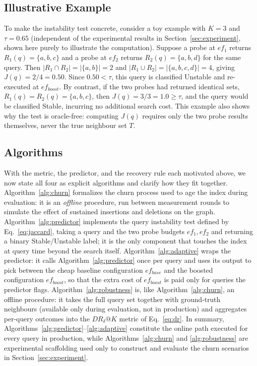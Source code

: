 \documentclass{ieeeaccess}
\begin{document}
\subsection{Illustrative Example}
\label{sec:toyexample}
To make the instability test concrete, consider a toy example with $K=3$ and $\tau=0.65$ (independent of the experimental results in Section~\ref{sec:experiment}, shown here purely to illustrate the computation). Suppose a probe at $ef_1$ returns $R_1(q)=\{a,b,c\}$ and a probe at $ef_2$ returns $R_2(q)=\{a,b,d\}$ for the same query. Then $|R_1\cap R_2|=|\{a,b\}|=2$ and $|R_1\cup R_2|=|\{a,b,c,d\}|=4$, giving $J(q)=2/4=0.50$. Since $0.50<\tau$, this query is classified Unstable and re-executed at $ef_{boost}$. By contrast, if the two probes had returned identical sets, $R_1(q)=R_2(q)=\{a,b,c\}$, then $J(q)=3/3=1.0 \ge \tau$, and the query would be classified Stable, incurring no additional search cost. This example also shows why the test is oracle-free: computing $J(q)$ requires only the two probe results themselves, never the true neighbour set $T$.

\subsection{Algorithms}
With the metric, the predictor, and the recovery rule each motivated above, we now state all four as explicit algorithms and clarify how they fit together. Algorithm~\ref{alg:churn} formalizes the churn process used to age the index during evaluation: it is an \emph{offline} procedure, run between measurement rounds to simulate the effect of sustained insertions and deletions on the graph. Algorithm~\ref{alg:predictor} implements the query instability test defined by Eq.~\ref{eq:jaccard}, taking a query and the two probe budgets $ef_1, ef_2$ and returning a binary Stable/Unstable label; it is the only component that touches the index at query time beyond the search itself. Algorithm~\ref{alg:adaptive} wraps the predictor: it calls Algorithm~\ref{alg:predictor} once per query and uses its output to pick between the cheap baseline configuration $ef_{base}$ and the boosted configuration $ef_{boost}$, so that the extra cost of $ef_{boost}$ is paid only for queries the predictor flags. Algorithm~\ref{alg:robustness} is, like Algorithm~\ref{alg:churn}, an offline procedure: it takes the full query set together with ground-truth neighbours (available only during evaluation, not in production) and aggregates per-query outcomes into the $DR_{\delta}@K$ metric of Eq.~\ref{eq:dr}. In summary, Algorithms~\ref{alg:predictor}--\ref{alg:adaptive} constitute the online path executed for every query in production, while Algorithms~\ref{alg:churn} and \ref{alg:robustness} are experimental scaffolding used only to construct and evaluate the churn scenarios in Section~\ref{sec:experiment}.
\end{document}
